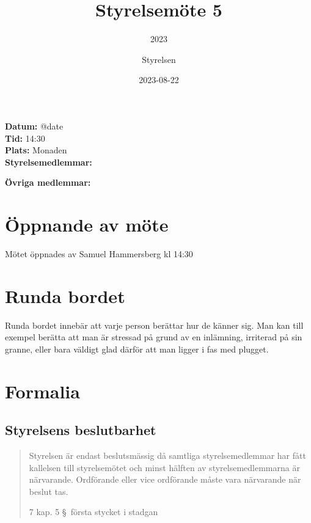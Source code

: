 \documentclass[protokoll]{dvd}
\begin{document}
\title{Styrelsemöte 5}
\subtitle{2023}
\author{Styrelsen}
\date{2023-08-22}


\textbf{Datum:} \csname @date\endcsname\\
\textbf{Tid:} 14:30\\
\textbf{Plats:} Monaden\\
\textbf{Styrelsemedlemmar:}
\begin{närvarande_förtroendevalda}
\end{närvarande_förtroendevalda}

\textbf{Övriga medlemmar:}
\begin{närvarande_medlemmar}
\end{närvarande_medlemmar}

\section{Öppnande av möte}

Mötet öppnades av Samuel Hammersberg kl 14:30

\section{Runda bordet}

Runda bordet innebär att varje person berättar hur de känner sig.
Man kan till exempel berätta att man är stressad på grund av en inlämning, irriterad på sin granne, eller bara väldigt glad därför att man ligger i fas med plugget.

\section{Formalia}

\subsection{Styrelsens beslutbarhet}

\blockquote[7 kap. 5 \S~första stycket i stadgan][]{%
    Styrelsen är endast beslutsmässig då samtliga styrelsemedlemmar har fått kallelsen till styrelsemötet och minst hälften av styrelsemedlemmarna är närvarande.
    Ordförande eller vice ordförande måste vara närvarande när beslut tas.
}
\end{document}
